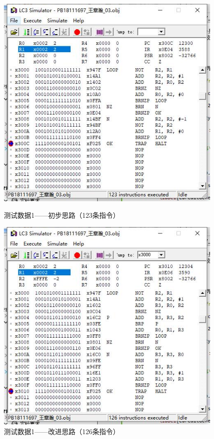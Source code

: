 \documentclass[UTF8]{article}
\begin{document}
	\begin{figure}[H]
		\begin{minipage}[H]{0.48\linewidth}
			\centering
			\includegraphics[scale=0.45]{data1_1.jpg}
			\caption{测试数据1——初步思路（123条指令）}
			\label{data1_1}
		\end{minipage}
		\qquad
		\begin{minipage}[H]{0.48\linewidth}
			\centering
			\includegraphics[scale=0.45]{data1_2.jpg}
			\caption{测试数据1——改进思路（126条指令）}
			\label{data1_2}
		\end{minipage}
	\end{figure}
\end{document}

